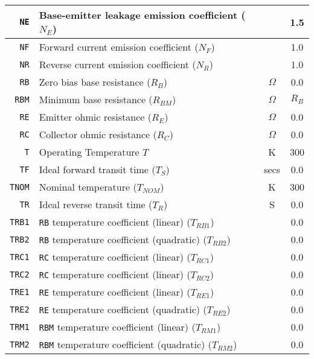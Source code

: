 \documentclass{article}
\begin{document}
\begin{tabular}{|r|l|c|c|}
\hline
\texttt{NE} & Base-emitter leakage emission coefficient ($N_E$) &  & 1.5 \\
\hline
\texttt{NF} & Forward current emission coefficient ($N_F$) & & 1.0 \\
\hline
\texttt{NR} & Reverse current emission coefficient ($N_R$) & & 1.0 \\
\hline
\texttt{RB} & Zero bias base resistance ($R_B$) & $\Omega$ & 0.0 \\
\hline
\texttt{RBM} & Minimum base resistance ($R_{BM}$) & $\Omega$ & $R_B$ \\
\hline
\texttt{RE} & Emitter ohmic resistance ($R_E$) & $\Omega$ & 0.0 \\
\hline
\texttt{RC} & Collector ohmic resistance ($R_C$) & $\Omega$ &  0.0 \\
\hline
\texttt{T} & Operating Temperature $T$& K &  300 \\
\hline
\texttt{TF} & Ideal forward transit time ($T_S$) & secs & 0.0 \\
\hline
\texttt{TNOM} & Nominal temperature ($T_{NOM}$) & K & 300 \\
\hline
\texttt{TR} & Ideal reverse transit time ($T_R$) & S & 0.0 \\
\hline
\texttt{TRB1} & \texttt{RB} temperature coefficient (linear) ($T_{RB1}$) & & 0.0 \\
\hline
\texttt{TRB2} & \texttt{RB} temperature coefficient  (quadratic) ($T_{RB2}$) & & 0.0 \\
\hline
\texttt{TRC1} & \texttt{RC} temperature coefficient (linear) ($T_{RC1}$) & & 0.0 \\
\hline
\texttt{TRC2} & \texttt{RC} temperature coefficient (linear) ($T_{RC2}$) & & 0.0 \\
\hline
\texttt{TRE1} & \texttt{RE} temperature coefficient (linear) ($T_{RE1}$) & & 0.0 \\
\hline
\texttt{TRE2} & \texttt{RE} temperature coefficient (quadratic) ($T_{RE2}$) & & 0.0 \\
\hline
\texttt{TRM1} & \texttt{RBM} temperature coefficient (linear) ($T_{RM1}$) & & 0.0 \\
\hline
\texttt{TRM2} & \texttt{RBM} temperature coefficient (quadratic) ($T_{RM2}$) & & 0.0 \\
\hline
\end{tabular}
\end{document}
